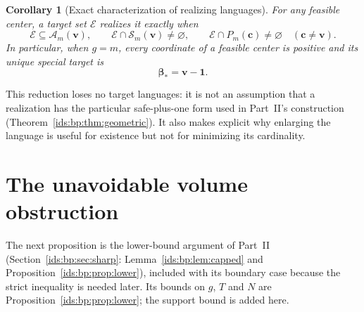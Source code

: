 \documentclass[11pt,letterpaper]{article}
\newtheorem{corollary}[theorem]{Corollary}
\theoremstyle{definition}\newtheorem{definition}[theorem]{Definition}
\theoremstyle{remark}\newtheorem{remark}[theorem]{Remark}
\theoremstyle{definition}\newtheorem{question}[theorem]{Question}
\newcommand{\bpE}{\mathcal E}
\newcommand{\Adm}[1]{\mathcal A_m(#1)}
\newcommand{\bpSpecial}[1]{\mathcal S_m(#1)}
\begin{document}
\begin{corollary}[Exact characterization of realizing languages]
\label{ids:si:cor:languages}
For any feasible center, a target set $\bpE$ realizes it exactly when
\begin{equation}\label{ids:si:eq:alllanguages}
 \bpE\subseteq\Adm{\mathbf v},\qquad \bpE\cap\bpSpecial{\mathbf v}\ne\varnothing,
 \qquad \bpE\cap P_m(\mathbf c)\ne\varnothing\quad(\mathbf c\ne\mathbf v).
\end{equation}
In particular, when $g=m$, every coordinate of a feasible center is positive
and its unique special target is
\begin{equation}\label{ids:si:eq:unique-special}
 \boldsymbol\beta_* = \mathbf v-\mathbf 1.
\end{equation}
\end{corollary}
This reduction loses no target languages: it is not an assumption that a
realization has the particular safe-plus-one form used in Part~II's
construction (Theorem~\ref{ids:bp:thm:geometric}). It also makes explicit why enlarging the language is useful
for existence but not for minimizing its cardinality.

\section{The unavoidable volume obstruction}\label{ids:si:sec:volume}

The next proposition is the lower-bound argument of Part~II
(Section~\ref{ids:bp:sec:sharp}: Lemma~\ref{ids:bp:lem:capped} and
Proposition~\ref{ids:bp:prop:lower}), included with its boundary case because
the strict inequality is needed later. Its bounds on $g$, $T$ and $N$ are
Proposition~\ref{ids:bp:prop:lower}; the support bound is added here.
\end{document}

